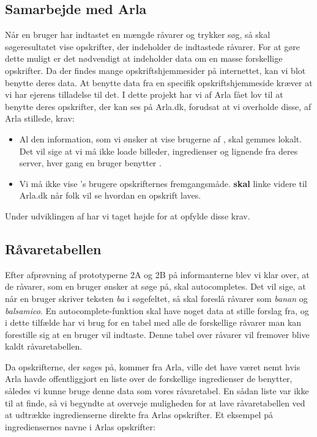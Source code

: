 \subsection{Samarbejde med Arla}
Når en bruger har indtastet en mængde råvarer og trykker søg, så skal søgeresultatet vise opskrifter, der indeholder de indtastede råvarer. For at gøre dette muligt er det nødvendigt at \Foodl indeholder data om en masse forskellige opskrifter. Da der findes mange opskriftshjemmesider på internettet, kan vi blot benytte deres data. At benytte data fra en specifik opskriftshjemmeside kræver at vi har ejerens tilladelse til det. I dette projekt har vi af Arla fået lov til at benytte deres opskrifter, der kan ses på Arla.dk, forudsat at vi overholde disse, af Arla stillede, krav:
\begin{itemize}
\item Al den information, som vi ønsker at vise brugerne af \Foodl, skal gemmes lokalt. Det vil sige at vi må ikke loade billeder, ingredienser og lignende fra deres server, hver gang en bruger benytter \Foodl.
\item Vi må ikke vise \Foodl{}'s brugere opskrifternes fremgangsmåde. \Foodl \textbf{skal} linke videre til Arla.dk når folk vil se hvordan en opskrift laves.
\end{itemize}
Under udviklingen af \Foodl har vi taget højde for at opfylde disse krav.

\subsection{Råvaretabellen}
Efter afprøvning af prototyperne 2A og 2B på informanterne blev vi klar over, at de råvarer, som en bruger ønsker at søge på, skal autocompletes. Det vil sige, at når en bruger skriver teksten \textit{ba} i søgefeltet, så skal \Foodl foreslå råvarer som \fx \textit{banan} og \textit{balsamico}.
En autocomplete-funktion skal have noget data at stille forslag fra, og i dette tilfælde har vi brug for en tabel med alle de forskellige råvarer man kan forestille sig at en bruger vil indtaste. Denne tabel over råvarer vil fremover blive kaldt råvaretabellen.

Da opskrifterne, der søges på, kommer fra Arla, ville det have været nemt hvis Arla havde offentliggjort en liste over de forskellige ingredienser de benytter, således vi kunne bruge denne data som vores råvaretabel. En sådan liste var ikke til at finde, så vi begyndte at overveje muligheden for at lave råvaretabellen ved at udtrække ingredienserne direkte fra Arlas opskrifter. Et eksempel på ingrediensernes navne i Arlas opskrifter:

